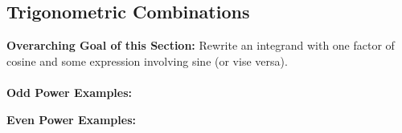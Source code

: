 \documentclass[addpoints, 12pt]{exam}
\begin{document}
\subsection*{Trigonometric Combinations}
\textbf{Overarching Goal of this Section:} Rewrite an integrand with one factor of cosine and some expression involving sine (or vise versa).\\
\\
\textbf{Odd Power Examples:}


\textbf{Even Power Examples:}


\newpage
\end{document}
